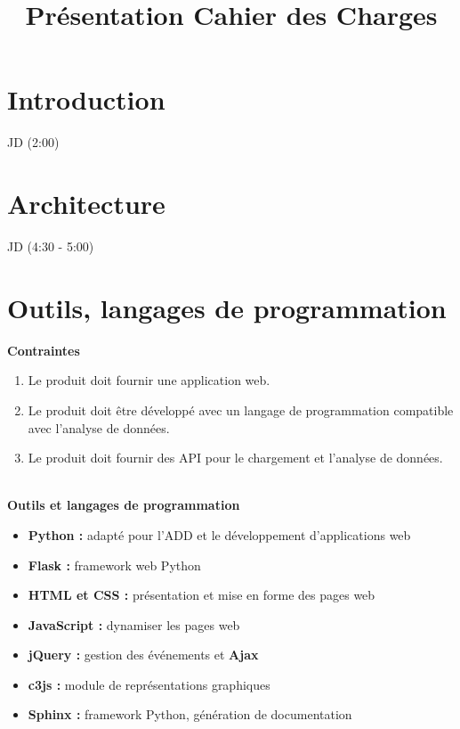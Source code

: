 
\usepackage{../tex/myInfolines}
\usepackage{longtable,array}
\title{Présentation Cahier des Charges}



	\begin{frame}
		\titlepage
	\end{frame}
	
	\section{Introduction}
		\begin{frame}
			JD (2:00)
		\end{frame}
	
	\section{Architecture}
		\begin{frame}
			JD (4:30 - 5:00)
		\end{frame}	
	
	\section{Outils, langages de programmation} 
		\begin{frame} 
			\textbf{Contraintes}
			\begin{enumerate}
				\item Le produit doit fournir une application web.
				\item Le produit doit être développé avec un langage de programmation compatible avec l’analyse de données.
				\item Le produit doit fournir des API pour le chargement et l’analyse de données.
			\end{enumerate}
			~\\
			\textbf{Outils et langages de programmation}
			\begin{itemize}
				\item \textbf{Python :} adapté pour l’ADD et le développement d’applications web
				\item \textbf{Flask :} framework web Python
				\item \textbf{HTML et CSS :} présentation et mise en forme des pages web
				\item \textbf{JavaScript :} dynamiser les pages web
				\item \textbf{jQuery :} gestion des événements et \textbf{Ajax}
				\item \textbf{c3js :} module de représentations graphiques
				\item \textbf{Sphinx :} framework Python, génération de documentation
			\end{itemize}
		\end{frame}
	
